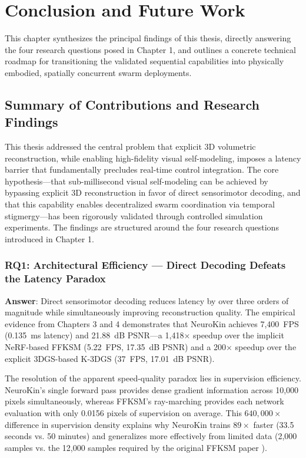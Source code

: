\documentclass[12pt,a4paper,oneside]{report}
\begin{document}
\chapter{Conclusion and Future Work}
\label{chap:conclusion_future_work}

This chapter synthesizes the principal findings of this thesis, directly answering the four research questions posed in Chapter 1, and outlines a concrete technical roadmap for transitioning the validated sequential capabilities into physically embodied, spatially concurrent swarm deployments.

\section{Summary of Contributions and Research Findings}

This thesis addressed the central problem that explicit 3D volumetric reconstruction, while enabling high-fidelity visual self-modeling, imposes a latency barrier that fundamentally precludes real-time control integration. The core hypothesis---that sub-millisecond visual self-modeling can be achieved by bypassing explicit 3D reconstruction in favor of direct sensorimotor decoding, and that this capability enables decentralized swarm coordination via temporal stigmergy---has been rigorously validated through controlled simulation experiments. The findings are structured around the four research questions introduced in Chapter 1.

\subsection{RQ1: Architectural Efficiency --- Direct Decoding Defeats the Latency Paradox}
\textbf{Answer}: Direct sensorimotor decoding reduces latency by over three orders of magnitude while simultaneously improving reconstruction quality. The empirical evidence from Chapters 3 and 4 demonstrates that NeuroKin achieves 7,400~FPS (0.135~ms latency) and 21.88~dB PSNR---a 1,418$\times$ speedup over the implicit NeRF-based FFKSM (5.22~FPS, 17.35~dB PSNR) and a 200$\times$ speedup over the explicit 3DGS-based K-3DGS (37~FPS, 17.01~dB PSNR). 

The resolution of the apparent speed-quality paradox lies in supervision efficiency. NeuroKin's single forward pass provides dense gradient information across 10,000 pixels simultaneously, whereas FFKSM's ray-marching provides each network evaluation with only 0.0156 pixels of supervision on average. This $640,000\times$ difference in supervision density explains why NeuroKin trains $89\times$ faster (33.5 seconds vs. 50 minutes) and generalizes more effectively from limited data (2,000 samples vs. the 12,000 samples required by the original FFKSM paper \cite{hu2024teaching}).
\end{document}
